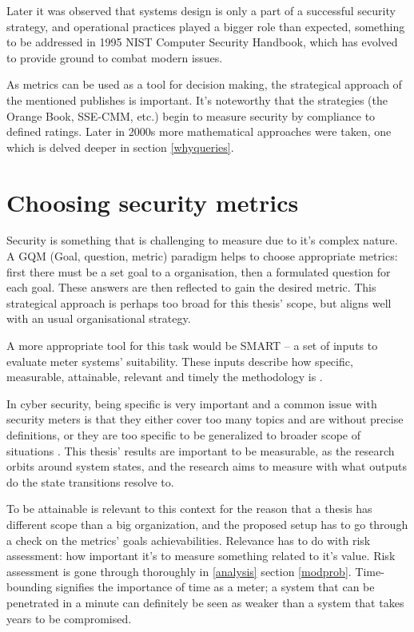 Later it was observed that systems design is only a part of a
successful security strategy, and operational practices played a
bigger role than expected, something to be addressed in 1995 NIST
Computer Security Handbook, which has evolved to provide ground to
combat modern issues. \cite{bayuk2013measuring}

As metrics can be used as a tool for decision making, the strategical
approach of the mentioned publishes is important. It's noteworthy that
the strategies (the Orange Book, SSE-CMM, etc.) begin to measure
security by compliance to defined ratings. Later in 2000s more
mathematical approaches were taken, one which is delved deeper in
section \ref{whyqueries}. \cite{bayuk2013measuring}

\section{Choosing security metrics} \label{choosingsecmet}

Security is something that is challenging to measure due to it's
complex nature. A GQM (Goal, question, metric) paradigm helps to
choose appropriate metrics: first there must be a set goal to a
organisation, then a formulated question for each goal. These answers
are then reflected to gain the desired metric. This strategical
approach is perhaps too broad for this thesis' scope, but aligns well
with an usual organisational strategy. \cite{papazov2019cybersecurity}

A more appropriate tool for this task would be SMART – a set of inputs
to evaluate meter systems' suitability. These inputs describe how
specific, measurable, attainable, relevant and timely the methodology
is \cite{payne2006guide}.

In cyber security, being specific is very important and a common issue
with security meters is that they either cover too many topics and are
without precise definitions, or they are too specific to be
generalized to broader scope of situations
\cite{wang2005information}. This thesis' results are important to be
measurable, as the research orbits around system states, and the
research aims to measure with what outputs do the state transitions
resolve to.

To be attainable is relevant to this context for the reason that a
thesis has different scope than a big organization, and the
proposed setup has to go through a check on the metrics' goals
achievabilities. Relevance has to do with risk assessment: how important
it's to measure something related to it's value. Risk assessment is
gone through thoroughly in \ref{analysis} section
\ref{modprob}. Time-bounding signifies the importance of time as a
meter; a system that can be penetrated in a minute can definitely be
seen as weaker than a system that takes years to be compromised.


